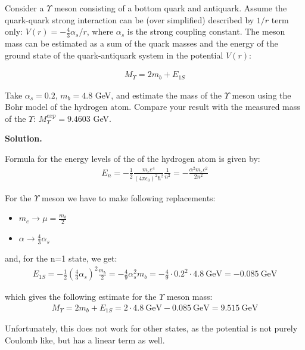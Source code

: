 \documentclass[11pt,a4paper]{article}
\newenvironment{solution}{\vspace{1cm} \par\textbf{Solution.} \vspace{1cm}}{\newpage}
\begin{document}
Consider a $\Upsilon$ meson consisting of a bottom quark and antiquark.
Assume the quark-quark strong interaction can be (over simplified) described 
by $1/r$ term only: $V(r) = -\frac{4}{3}\alpha_s/r$, where $\alpha_s$ is the strong 
coupling constant. The meson mass can be estimated as a sum of the quark masses and 
the energy of the ground state of the quark-antiquark system in the potential $V(r)$: 

\begin{align*}
M_{\Upsilon} = 2 m_b + E_{1S}
\end{align*}

Take $\alpha_s = 0.2$, $m_b = 4.8$ GeV, and estimate the mass of the $\Upsilon$ meson using 
the Bohr model of the hydrogen atom. Compare your result with the measured mass 
of the $\Upsilon$: $M_{\Upsilon}^{exp} = 9.4603$ GeV.

\begin{solution}

Formula for the energy levels of the of the hydrogen atom is given by:
\begin{align*}
E_n = -\frac{1}{2} \frac{m_e e^4}{(4\pi \epsilon_0)^2 \hbar^2} \frac{1}{n^2} =
-\frac{\alpha^2 m_e c^2}{2 n^2}
\end{align*}

For the $\Upsilon$ meson we have to make following replacements:
\begin{itemize}
    \item $m_e \rightarrow \mu = \frac{m_b}{2}$
    \item $\alpha \rightarrow \frac{4}{3} \alpha_s$
\end{itemize}

and, for the n=1 state, we get:
\begin{align*}
E_{1S} = -\frac{1}{2} \left( \frac{4}{3} \alpha_s \right)^2 \frac{m_b}{2}
= -\frac{4}{9} \alpha_s^2 m_b = -\frac{4}{9} \cdot 0.2^2 \cdot 4.8~\text{GeV} = -0.085~\text{GeV}
\end{align*}

which gives the following estimate for the $\Upsilon$ meson mass:
\begin{align*}
M_{\Upsilon} = 2 m_b + E_{1S} = 2 \cdot 4.8~\text{GeV} - 0.085~\text{GeV} = 9.515~\text{GeV}    
\end{align*}

Unfortunately, this does not work for other states, as the potential is not 
purely Coulomb like, but has a linear term as well.

\end{solution}
\end{document}
